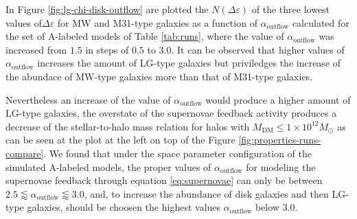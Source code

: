 \documentclass[usenatbib]{mn2e}
\begin{document}

In Figure \ref{fig:lg-chi-disk-outflow} are plotted the
$N(\Delta\varepsilon)$ of the three lowest values
of$\Delta\varepsilon$ for MW and M31-type galaxies as a function of
$\alpha_{\text{outflow}}$ calculated  for the set of A-labeled models
of Table  \ref{tab:runs}, where the value of $\alpha_{\text{outflow}}$
was increased from $1.5$ in steps of $0.5$  to $3.0$.  It can be
observed that higher values of $\alpha_{\text{outflow}}$ increases the
amount of LG-type galaxies but priviledges the increase of the
abundace of MW-type galaxies more than that of M31-type galaxies.  


Nevertheless an increase of the value of $\alpha_{\text{outflow}}$
would produce a higher amount of LG-type galaxies, the overstate of
the supernovae feedback activity produces a decrease of the
stellar-to-halo mass relation for halos with $M_{\text{DM}}\le 1\times
10^{12}M_{\odot}$ as can be seen at the plot at the left on top of the
Figure \ref{fig:properties-runs-compare}. We found that  under the
space parameter configuration of the simulated A-labeled models,  the
proper values of $\alpha_{\text{outflow}}$ for modeling the supernovae
feedback through  equation \ref{eq:supernovae} can only be  between
$2.5 \lessapprox \alpha_{\text{outflow}} \lessapprox 3.0$, and, to
increase the abundance of disk galaxies and then LG-type galaxies,
should be choosen the highest values $\alpha_{\text{outflow}}$ below
$3.0$. 
\end{document}
